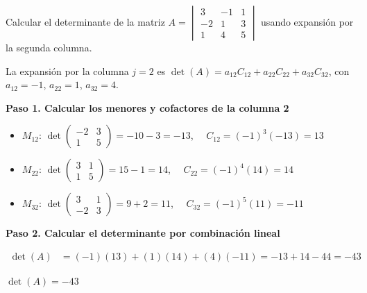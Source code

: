 \begin{example}
\label{ex:det-col2}
Calcular el determinante de la matriz \(
A = \begin{vmatrix}
3 & -1 & 1 \\
-2 & 1 & 3 \\
1 & 4 & 5
\end{vmatrix}
\) usando expansión por la segunda columna.

\begin{myproof}
La expansión por la columna $j=2$ es $\det(A) = a_{12}C_{12} + a_{22}C_{22} + a_{32}C_{32}$, con $a_{12}=-1$, $a_{22}=1$, $a_{32}=4$.

\textbf{Paso 1. Calcular los menores y cofactores de la columna 2}

\begin{itemize}
\item $M_{12}$: $\det\begin{pmatrix}-2&3\\1&5\end{pmatrix}=-10-3=-13$, $\quad C_{12}=(-1)^{3}(-13)=13$

\item $M_{22}$: $\det\begin{pmatrix}3&1\\1&5\end{pmatrix}=15-1=14$, $\quad C_{22}=(-1)^{4}(14)=14$

\item $M_{32}$: $\det\begin{pmatrix}3&1\\-2&3\end{pmatrix}=9+2=11$, $\quad C_{32}=(-1)^{5}(11)=-11$
\end{itemize}

\textbf{Paso 2. Calcular el determinante por combinación lineal}

\begin{align*}
\det(A) &= (-1)(13) + (1)(14) + (4)(-11) = -13 + 14 - 44 = -43
\end{align*}

$\boxed{\det(A) = -43}$
\end{myproof}
\end{example}



